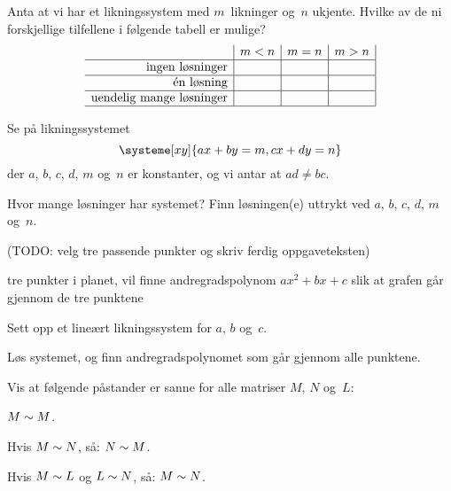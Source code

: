 \begin{oppgave}
Anta at vi har et likningssystem med $m$~likninger og~$n$ ukjente.
Hvilke av de ni forskjellige tilfellene i følgende tabell er mulige?
\[
\begin{array}{r|c|c|c|}
                                & m < n & m = n & m > n \\ \hline
\text{ingen løsninger}          &       &       &       \\ \hline
\text{én løsning}               &       &       &       \\ \hline
\text{uendelig mange løsninger} &       &       &       \\ \hline
\end{array}
\]
\end{oppgave}


\begin{oppgave}
Se på likningssystemet
\[
\systeme[xy]{
  ax + by = m,
  cx + dy = n
}
\]
der $a$, $b$, $c$, $d$, $m$ og~$n$ er konstanter, og vi antar at $ad \ne bc$.

Hvor mange løsninger har systemet?  Finn løsningen(e) uttrykt ved $a$,
$b$, $c$, $d$, $m$ og~$n$.
\end{oppgave}


\begin{oppgave}
(TODO: velg tre passende punkter og skriv ferdig oppgaveteksten)

tre punkter i planet, vil finne andregradspolynom $ax^2 + bx + c$ slik
at grafen går gjennom de tre punktene
\begin{punkt}
Sett opp et lineært likningssystem for $a$, $b$ og~$c$.
\end{punkt}
\begin{punkt}
Løs systemet, og finn andregradspolynomet som går gjennom alle punktene.
\end{punkt}
\end{oppgave}


\begin{oppgave}
Vis at følgende påstander er sanne for alle matriser $M$, $N$ og~$L$:
\begin{punkt}
$M \sim M$.
\end{punkt}
\begin{punkt}
Hvis $M \sim N$, så: $N \sim M$.
\end{punkt}
\begin{punkt}
Hvis $M \sim L$ og $L \sim N$, så: $M \sim N$.
\end{punkt}
\end{oppgave}
